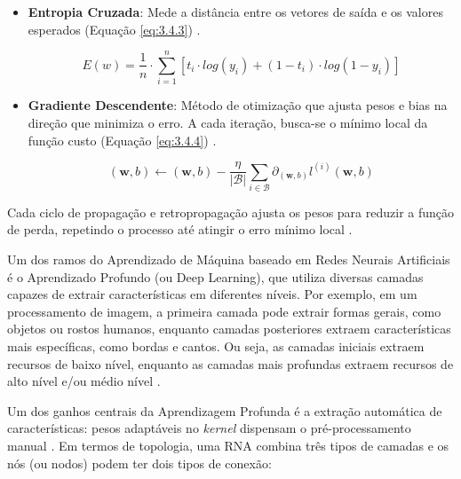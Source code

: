 \begin{itemize}
\begin{itemize}
            \begin{equation}
                MAE = \frac{ \sum_{i=1}^{n} |O_{i} - P_{i}|}{n}
                \label{eq:3.4.6}
            \end{equation}
        
        \item \textbf{Entropia Cruzada}: Mede a distância entre os vetores de saída e os valores esperados (Equação \ref{eq:3.4.3}) \cite{nasr2002}.

            \begin{equation}
                E(w) = \frac{1}{n} \cdot \sum_{i=1}^{n} [t_{i} \cdot log(y_{i}) + (1 - t_{i}) \cdot log(1 - y_{i})]
                \label{eq:3.4.3}
            \end{equation}
        
        \item \textbf{Gradiente Descendente}: Método de otimização que ajusta pesos e bias na direção que minimiza o erro. A cada iteração, busca-se o mínimo local da função custo (Equação \ref{eq:3.4.4}) \cite{rumelhart1986}.

            \begin{equation}
                (\mathbf{w},b) \leftarrow (\mathbf{w},b) - \frac{\eta}{|\mathcal{B}|} \sum_{i \in \mathcal{B}} \partial_{(\mathbf{w},b)} l^{(i)}(\mathbf{w},b)
                \label{eq:3.4.4}
            \end{equation}
    \end{itemize}
\end{itemize}

Cada ciclo de propagação e retropropagação ajusta os pesos para reduzir a função de perda, repetindo o processo até atingir o erro mínimo local \cite{russel2010}.

Um dos ramos do Aprendizado de Máquina baseado em Redes Neurais Artificiais é o Aprendizado Profundo (ou Deep Learning), que utiliza diversas camadas capazes de extrair características em diferentes níveis. Por exemplo, em um processamento de imagem, a primeira camada pode extrair formas gerais, como objetos ou rostos humanos, enquanto camadas posteriores extraem características mais específicas, como bordas e cantos. Ou seja, as camadas iniciais extraem recursos de baixo nível, enquanto as camadas mais profundas extraem recursos de alto nível e/ou médio nível \cite{schmidhuber2015}.

Um dos ganhos centrais da Aprendizagem Profunda é a extração automática de características: pesos adaptáveis no \textit{kernel} dispensam o pré-processamento manual \cite{schmidhuber2015}. Em termos de topologia, uma RNA combina três tipos de camadas e os nós (ou nodos) podem ter dois tipos de conexão:

